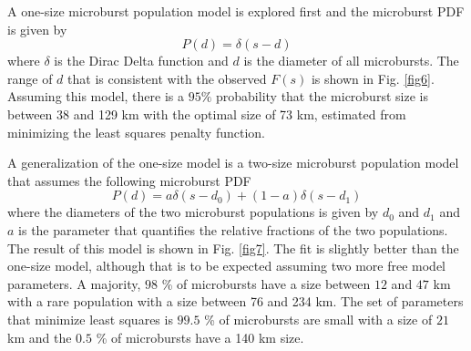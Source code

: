 \documentclass[draft]{agujournal2019}
\begin{document}
A one-size microburst population model is explored first and the microburst PDF is given by 
\begin{equation}
P(d) = \delta(s-d)
\end{equation} where $\delta$ is the Dirac Delta function and $d$ is the diameter of all microbursts. The range of $d$ that is consistent with the observed $F(s)$ is shown in Fig. \ref{fig6}. Assuming this model, there is a $95 \%$ probability that the microburst size is between 38 and 129 km with the optimal size of 73 km, estimated from minimizing the least squares penalty function. 

A generalization of the one-size model is a two-size microburst population model that assumes the following microburst PDF
\begin{equation}
P(d) = a \delta(s-d_0) + (1-a)\delta(s-d_1)
\end{equation} where the diameters of the two microburst populations is given by $d_0$ and $d_1$ and $a$ is the parameter that quantifies the relative fractions of the two populations. The result of this model is shown in Fig. \ref{fig7}. The fit is slightly better than the one-size model, although that is to be expected assuming two more free model parameters. A majority, $98$ \% of microbursts have a size between $12$ and $47$ km with a rare population with a size between 76 and 234 km. The set of parameters that minimize least squares is $99.5$ \% of microbursts are small with a size of $21$ km and the $0.5$ \% of microbursts have a 140 km size.
\end{document}
